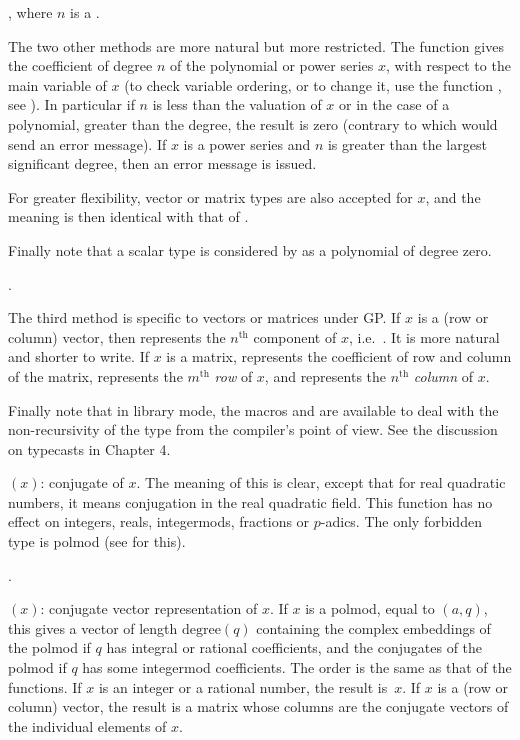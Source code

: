 , where $n$ is a .

The two other methods are more natural but more restricted. The function
 gives the coefficient of degree $n$ of the polynomial
or power series $x$, with respect to the main variable of $x$ (to check
variable ordering, or to change it, use the function , see
). In particular if $n$ is less than the valuation of
$x$ or in the case of a polynomial, greater than the degree, the result is
zero (contrary to  which would send an error message). If $x$ is
a power series and $n$ is greater than the largest significant degree, then
an error message is issued.

For greater flexibility, vector or matrix types are also accepted for $x$,
and the meaning is then identical with that of .

Finally note that a scalar type is considered by  as a
polynomial of degree zero.

.

The third method is specific to vectors or matrices under GP. If $x$ is a
(row or column) vector, then  represents the $n^{\text{th}}$
component of $x$, i.e.~. It is more natural and shorter to
write. If $x$ is a matrix,  represents the coefficient of
row  and column  of the matrix,  represents
the $m^{\text{th}}$ \emph{row} of $x$, and  represents
the $n^{\text{th}}$ \emph{column} of $x$.

Finally note that in library mode, the macros  and 
are available to deal with the non-recursivity of the  type from the
compiler's point of view. See the discussion on typecasts in Chapter 4.

$(x)$: conjugate of $x$. The meaning of this
is clear, except that for real quadratic numbers, it means conjugation in the
real quadratic field. This function has no effect on integers, reals,
integermods, fractions or $p$-adics. The only forbidden type is polmod
(see  for this).

.

$(x)$: conjugate vector representation of $x$. If $x$ is a
polmod, equal to $(a,q)$, this gives a vector of length
$\text{degree}(q)$ containing the complex embeddings of the polmod if $q$ has
integral or rational coefficients, and the conjugates of the polmod if $q$
has some integermod coefficients. The order is the same as that of the
 functions. If $x$ is an integer or a rational number, the
result is~$x$. If $x$ is a (row or column) vector, the result is a matrix
whose columns are the conjugate vectors of the individual elements of $x$.

